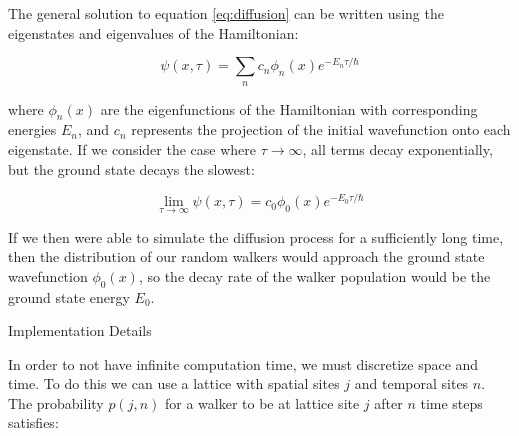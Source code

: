 \documentclass[reqno]{amsart}
\makeatletter
\renewcommand\subsection{\@startsection{subsection}{2}%
  \z@{.5\linespacing\@plus.7\linespacing}{-.5em}%
  {\normalfont\scshape\justify}}
\numberwithin{equation}{section}
\numberwithin{figure}{section}
\makeatother
\begin{document}
The general solution to equation \ref{eq:diffusion} can be written using the eigenstates and eigenvalues of the Hamiltonian:

\begin{equation}
\psi(x,\tau) = \sum_n c_n \phi_n(x)e^{-E_n\tau/\hbar}
\end{equation}

where $\phi_n(x)$ are the eigenfunctions of the Hamiltonian with corresponding energies $E_n$, and $c_n$ represents the projection of the initial wavefunction onto each eigenstate. If we consider the case where $\tau \to \infty$, all terms decay exponentially, but the ground state decays the slowest:

\begin{equation}
\lim_{\tau \to \infty}\psi(x,\tau) = c_0\phi_0(x)e^{-E_0\tau/\hbar}
\end{equation}

If we then were able to simulate the diffusion process for a sufficiently long time, then the distribution of our random walkers would approach the ground state wavefunction $\phi_0(x)$, so the decay rate of the walker population would be the ground state energy $E_0$.

\subsection{Implementation Details}

In order to not have infinite computation time, we must discretize space and time. To do this we can use a lattice with spatial sites $j$ and temporal sites $n$. The probability $p(j,n)$ for a walker to be at lattice site $j$ after $n$ time steps satisfies:
\end{document}
